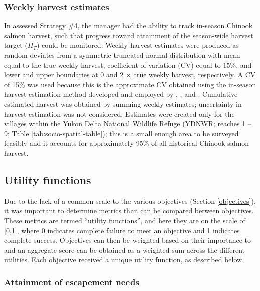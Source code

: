 \documentclass[12pt,]{book}
\theoremstyle{definition}
\theoremstyle{definition}
\theoremstyle{definition}
\theoremstyle{remark}
\begin{document}
\subsubsection{Weekly harvest estimates}\label{harv}

\noindent
In assessed Strategy \#4, the manager had the ability to track in-season
Chinook salmon harvest, such that progress toward attainment of the
season-wide harvest target (\(H_T\)) could be monitored. Weekly harvest
estimates were produced as random deviates from a symmetric truncated
normal distribution with mean equal to the true weekly harvest,
coefficient of variation (CV) equal to 15\%, and lower and upper
boundaries at 0 and 2 \(\times\) true weekly harvest, respectively. A CV
of 15\% was used because this is the approximate CV obtained using the
in-season harvest estimation method developed and employed by
\citet{staton-coggins-2016}, \citet{staton-coggins-2017}, and
\citet{staton-2018}. Cumulative estimated harvest was obtained by
summing weekly estimates; uncertainty in harvest estimation was not
considered. Estimates were created only for the villages within the
Yukon Delta National Wildlife Refuge (YDNWR; reaches 1 -- 9; Table
\ref{tab:socio-spatial-table}); this is a small enough area to be
surveyed feasibly and it accounts for approximately 95\% of all
historical Chinook salmon harvest.

\subsection{Utility functions}\label{utility-funcs}

\noindent
Due to the lack of a common scale to the various objectives (Section
\ref{objectives}), it was important to determine metrics than can be
compared between objectives. These metrics are termed ``utility
functions'', and here they are on the scale of {[}0,1{]}, where 0
indicates complete failure to meet an objective and 1 indicates complete
success. Objectives can then be weighted based on their importance to
and an aggregate score can be obtained as a weighted sum across the
different utilities. Each objective received a unique utility function,
as described below.

\subsubsection{Attainment of escapement needs}\label{S-metric}
\end{document}
